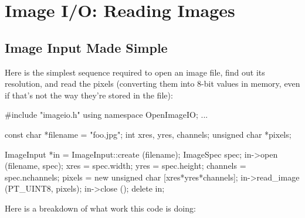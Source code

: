 \chapter{Image I/O: Reading Images}
\label{chap:imageinput}


\section{Image Input Made Simple}
\label{sec:imageinput:simple}

Here is the simplest sequence required to open an image file, find
out its resolution, and read the pixels (converting them into
8-bit values in memory, even if that's not the way they're stored in the file):

\begin{code}
        #include "imageio.h"
        using namespace OpenImageIO;
        ...

        const char *filename = "foo.jpg";
        int xres, yres, channels;
        unsigned char *pixels;

        ImageInput *in = ImageInput::create (filename);
        ImageSpec spec;
        in->open (filename, spec);
        xres = spec.width;
        yres = spec.height;
        channels = spec.nchannels;
        pixels = new unsigned char [xres*yres*channels];
        in->read_image (PT_UINT8, pixels);
        in->close ();
        delete in;
\end{code}

\noindent Here is a breakdown of what work this code is doing:

